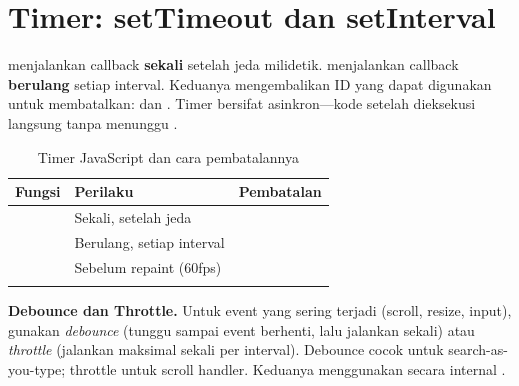 \section{Timer: setTimeout dan setInterval}

 menjalankan callback \textbf{sekali} setelah jeda milidetik.  menjalankan callback \textbf{berulang} setiap interval. Keduanya mengembalikan ID yang dapat digunakan untuk membatalkan:  dan . Timer bersifat asinkron---kode setelah  dieksekusi langsung tanpa menunggu \cite{jsInfo}.

\begin{table}[htbp]
\centering
\small
\begin{tabular}{|P{4cm}|P{3.2cm}|P{2.8cm}|}
\hline
\textbf{Fungsi} & \textbf{Perilaku} & \textbf{Pembatalan} \\
\hline
{} & Sekali, setelah jeda &  \\
\hline
{} & Berulang, setiap interval &  \\
\hline
{} & Sebelum repaint (60fps) & \\[\medskipamount] \\
\hline
\end{tabular}
\caption{Timer JavaScript dan cara pembatalannya}
\end{table}

\begin{konsep}
\textbf{Debounce dan Throttle.} Untuk event yang sering terjadi (scroll, resize, input), gunakan \textit{debounce} (tunggu sampai event berhenti, lalu jalankan sekali) atau \textit{throttle} (jalankan maksimal sekali per interval). Debounce cocok untuk search-as-you-type; throttle untuk scroll handler. Keduanya menggunakan  secara internal \cite{mdnJsGuide}.
\end{konsep}

